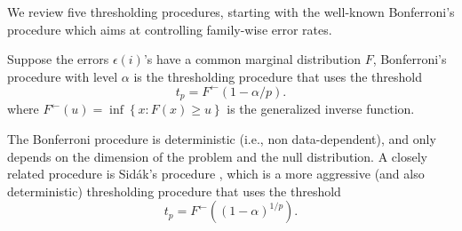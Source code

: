 We review five thresholding procedures, starting with the well-known Bonferroni's procedure which aims at controlling family-wise error rates.
\begin{definition}
Suppose the errors $\epsilon(i)$'s have a common marginal distribution $F$, Bonferroni's procedure with level $\alpha$ is the thresholding procedure that uses the threshold
\begin{equation} \label{eq:Bonferroni-procedure}
    t_p = F^{\leftarrow}(1 - \alpha/p).
\end{equation}
where  $F^{\leftarrow}(u)=\inf{\left\{x:F(x)\ge u\right\}}$ is the generalized inverse function.
\end{definition}
The Bonferroni procedure is deterministic (i.e., non data-dependent), and only depends on the dimension of the problem and the null distribution.
A closely related procedure is Sid\'ak's procedure \citep{vsidak1967rectangular},
which is a more aggressive (and also deterministic) thresholding procedure that uses the threshold
\begin{equation} \label{eq:Sidak-procedure}
    t_p = F^{\leftarrow}((1 - \alpha)^{1/p}).
\end{equation}

